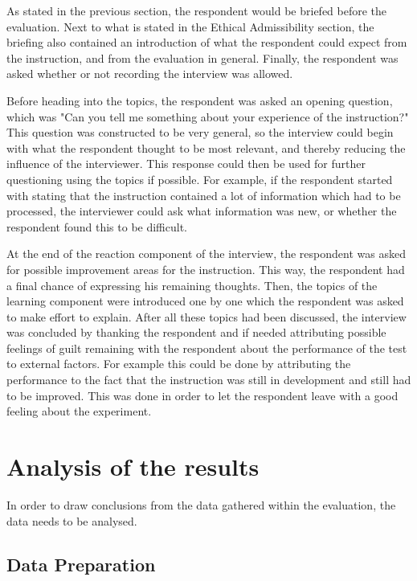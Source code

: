 \documentclass[11pt,twoside]{report} %
\begin{document}
As stated in the previous section, the respondent would be briefed before the evaluation. Next to what is stated in the Ethical Admissibility section, the briefing also contained an introduction of what the respondent could expect from the instruction, and from the evaluation in general. Finally, the respondent was asked whether or not recording the interview was allowed.

Before heading into the topics, the respondent was asked an opening question, which was "Can you tell me something about your experience of the instruction?" This question was constructed to be very general, so the interview could begin with what the respondent thought to be most relevant, and thereby reducing the influence of the interviewer. This response could then be used for further questioning using the topics if possible. For example, if the respondent started with stating that the instruction contained a lot of information which had to be processed, the interviewer could ask what information was new, or whether the respondent found this to be difficult.

At the end of the reaction component of the interview, the respondent was asked for possible improvement areas for the instruction. This way, the respondent had a final chance of expressing his remaining thoughts. Then, the topics of the learning component were introduced one by one which the respondent was asked to make effort to explain. After all these topics had been discussed, the interview was concluded by thanking the respondent and if needed attributing possible feelings of guilt remaining with the respondent about the performance of the test to external factors. For example this could be done by attributing the performance to the fact that the instruction was still in development and still had to be improved. This was done in order to let the respondent leave with a good feeling about the experiment.

\section{Analysis of the results}

In order to draw conclusions from the data gathered within the evaluation, the data needs to be analysed.

\subsection{Data Preparation}
\end{document}
